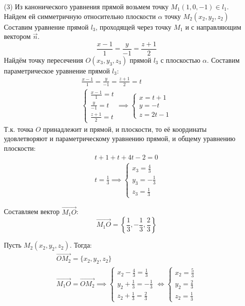 \begin{eg}
  (3) Из канонического уравнения прямой возьмем точку $M_1(1, 0, -1) \in l_1$. 
  Найдем ей симметричную относительно плоскости $\alpha$ точку $M_2(x_2, y_2, z_2)$
  Составим уравнение прямой $l_3$, проходящей через точку $M_1$ и с направляющим вектором $\vec{n}$. \[
    \frac{x - 1}{1} = \frac{y}{-1} = \frac{z + 1}{2}
  \] 
  Найдём точку пересечения $O(x_3, y_3, z_3)$ прямой $l_3$ с плоскостью $\alpha$. 
  Составим параметрическое уравнение прямой $l_3$:
  \begin{gather*}
    \frac{x - 1}{1} = \frac{y}{-1} = \frac{z + 1}{2} = t \\
    \begin{cases}
      \frac{x - 1}{1} = t \\
      \frac{y}{-1} = t \\
      \frac{z + 1}{2} = t
    \end{cases} \implies
    \begin{cases}
      x = t + 1 \\
      y = -t \\
      z = 2t - 1
    \end{cases}
  \end{gather*}
  Т.к. точка $O$ принадлежит и прямой, и плоскости, то её координаты удовлетворяют и параметрическому уравнению прямой, и общему уравнению плоскости:
  \begin{gather*}
    t + 1 + t + 4t - 2 = 0 \\
    t = \frac{1}{3} \implies \begin{cases}
      x_3 = \frac{4}{3} \\
      y_3 = -\frac{1}{3} \\
      z_3 = \frac{1}{3}
    \end{cases}
  \end{gather*}

  Составляем вектор $\overrightarrow{M_1O}$: \[
  \overrightarrow{M_1O} = \left\{\frac{1}{3}, -\frac{1}{3}, \frac{2}{3}\right\} 
  \] 

  Пусть $M_2(x_2, y_2, z_2)$. Тогда:
  \begin{gather*}
    \overrightarrow{OM_2} = \{x_2, y_2, z_2\} \\
    \overrightarrow{M_1O} = \overrightarrow{OM_2} \implies \begin{cases}
      x_2 - \frac{4}{3} = \frac{1}{3} \\
      y_2 + \frac{1}{3} = -\frac{1}{3} \\
      z_2 + \frac{1}{3} = \frac{2}{3}
    \end{cases} \iff \begin{cases}
      x_2 = \frac{5}{3} \\
      y_2 = \frac{2}{3} \\
      z_2 = \frac{1}{3}
    \end{cases}
  \end{gather*}


\end{eg}
